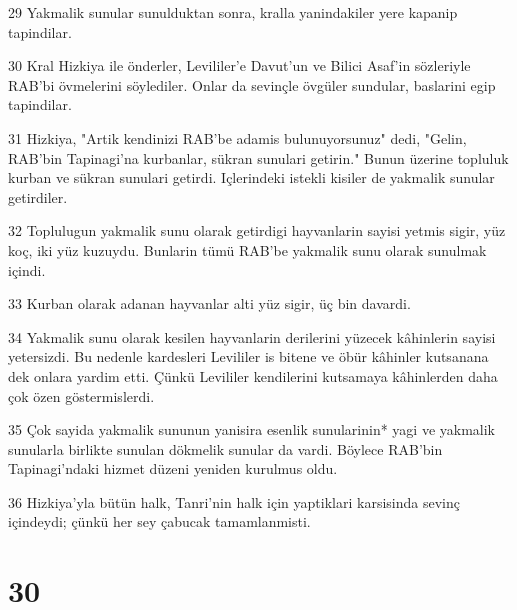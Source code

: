 \par 29 Yakmalik sunular sunulduktan sonra, kralla yanindakiler yere kapanip tapindilar.
\par 30 Kral Hizkiya ile önderler, Levililer'e Davut'un ve Bilici Asaf'in sözleriyle RAB'bi övmelerini söylediler. Onlar da sevinçle övgüler sundular, baslarini egip tapindilar.
\par 31 Hizkiya, "Artik kendinizi RAB'be adamis bulunuyorsunuz" dedi, "Gelin, RAB'bin Tapinagi'na kurbanlar, sükran sunulari getirin." Bunun üzerine topluluk kurban ve sükran sunulari getirdi. Içlerindeki istekli kisiler de yakmalik sunular getirdiler.
\par 32 Toplulugun yakmalik sunu olarak getirdigi hayvanlarin sayisi yetmis sigir, yüz koç, iki yüz kuzuydu. Bunlarin tümü RAB'be yakmalik sunu olarak sunulmak içindi.
\par 33 Kurban olarak adanan hayvanlar alti yüz sigir, üç bin davardi.
\par 34 Yakmalik sunu olarak kesilen hayvanlarin derilerini yüzecek kâhinlerin sayisi yetersizdi. Bu nedenle kardesleri Levililer is bitene ve öbür kâhinler kutsanana dek onlara yardim etti. Çünkü Levililer kendilerini kutsamaya kâhinlerden daha çok özen göstermislerdi.
\par 35 Çok sayida yakmalik sununun yanisira esenlik sunularinin* yagi ve yakmalik sunularla birlikte sunulan dökmelik sunular da vardi. Böylece RAB'bin Tapinagi'ndaki hizmet düzeni yeniden kurulmus oldu.
\par 36 Hizkiya'yla bütün halk, Tanri'nin halk için yaptiklari karsisinda sevinç içindeydi; çünkü her sey çabucak tamamlanmisti.

\chapter{30}

